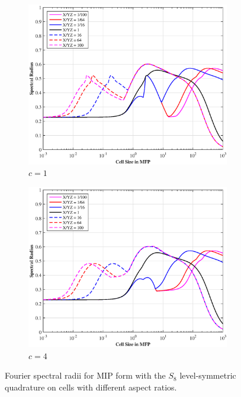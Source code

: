 \documentclass[preprint,review,12pt]{elsarticle}
\begin{document}
\begin{figure}
\centering
	\begin{subfigure}[b]{0.49\textwidth}
		\centering
		\includegraphics[width=0.975\textwidth]{figures/SI_MIP_hex_AR1.eps}
		\caption{$c=1$}
	\end{subfigure}
	\hfill
	\begin{subfigure}[b]{0.49\textwidth}
		\centering
		\includegraphics[width=0.975\textwidth]{figures/SI_MIP_hex_AR4.eps}
		\caption{$c=4$}
	\end{subfigure}
\caption{Fourier spectral radii for MIP form with the $S_8$ level-symmetric quadrature on cells with different aspect ratios.}
\label{fig::DSA_3D1G_Fourier_AR}
\end{figure}
\end{document}
